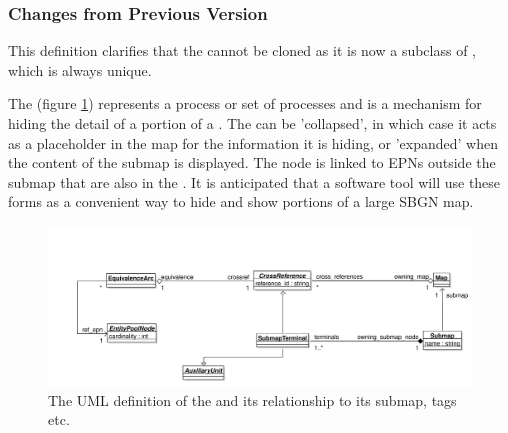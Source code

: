 \subsubsection{Changes from Previous Version}

This definition clarifies that the  cannot be
cloned as it is now a subclass of , which is always
unique.


\label{sec:techref:submap}\label{defn:Submap}

The  (figure \ref{fig:techref:submapnodeuml})
represents a process or set of processes and is a mechanism for hiding
the detail of a portion of a \PDm. The  can be
'collapsed', in which case it acts as a placeholder in the map for the
information it is hiding, or 'expanded' when the content of the submap
is displayed. The node is linked to EPNs outside the submap that are
also in the .  It is anticipated that a software tool
will use these forms as a convenient way to hide and show portions of
a large SBGN map.


\begin{figure}[htb]
  \centering
  \includegraphics[width = \textwidth]{images/submapnodeuml}
  \caption{The UML definition of the  and its
   relationship to its submap, tags etc.}
  \label{fig:techref:submapnodeuml}
\end{figure}

